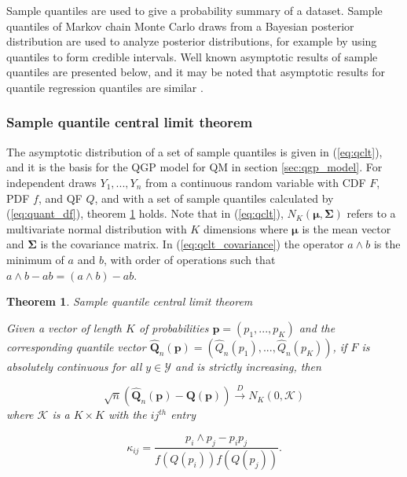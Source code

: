 \documentclass[preprint,12pt,authoryear]{elsarticle}
\newtheorem{theorem}{Theorem}
\newcommand{\1}[1]{\mathds{1}\left[#1\right]}
\begin{document}
Sample quantiles are used to give a probability summary of a dataset. Sample 
quantiles of Markov chain Monte Carlo draws from a Bayesian posterior 
distribution are used to analyze posterior distributions, for example by using 
quantiles to form credible intervals. 
Well known asymptotic results of sample quantiles are presented below, and it 
may be noted that asymptotic results for quantile regression quantiles are 
similar \cite[]{kocherginsky2005practical, koenker1978regression}. 

\subsubsection{Sample quantile central limit theorem} 

The asymptotic distribution of a set of sample quantiles is given in 
(\ref{eq:qclt}), and it is the basis for the QGP model for QM in section 
\ref{sec:qgp_model}. For independent draws $Y_1, ..., Y_n$ from a continuous 
random variable with CDF $F$, PDF $f$, and QF $Q$, and with a set of sample 
quantiles calculated by (\ref{eq:quant_df}), theorem \ref{thm:qclt} holds. 
Note that in (\ref{eq:qclt}), 
$N_K(\boldsymbol{\mu}, \boldsymbol{\Sigma})$ refers to a 
multivariate 
normal distribution with $K$ dimensions where $\boldsymbol{\mu}$ is the mean
vector and $\boldsymbol{\Sigma}$ is the covariance matrix. 
In (\ref{eq:qclt_covariance}) the 
operator $a \wedge b$ is the minimum of $a$ and $b$, with order of operations
such that $a \wedge b - ab = (a \wedge b) - ab$. 


\begin{theorem}{\emph{Sample quantile central limit theorem}}
\label{thm:qclt}

Given a vector of length $K$ of probabilities 
$\boldsymbol{p} = (p_1, ..., p_K)$ and the corresponding quantile vector 
$\hat{\boldsymbol{Q}}_n(\boldsymbol{p}) = (\hat{Q}_n(p_1), ..., \hat{Q}_n(p_K))$, 
if $F$ is absolutely continuous for all $y \in \mathcal{Y}$ and is strictly 
increasing, then

\begin{equation}
    \label{eq:qclt}
    \sqrt{n}(\hat{\boldsymbol{Q}}_n(\boldsymbol{p}) - 
    \boldsymbol{Q}(\boldsymbol{p})) \overset{D}{\rightarrow} 
    N_K(0, \boldsymbol{\mathcal{K}})
\end{equation}
where $\boldsymbol{\mathcal{K}}$ is a $K\times K$ with the $ij^{th}$ 
entry 

\begin{equation}
    \label{eq:qclt_covariance}
    \kappa_{ij} = \frac{p_i \wedge p_j - p_i p_j}{f(Q(p_i)) f(Q(p_j))}.
\end{equation}
\end{theorem}
\end{document}
